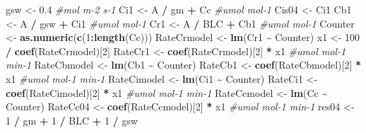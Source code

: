 \documentclass[
]{krantz}
\makeatletter
\newenvironment{Shaded}{\begin{snugshade}}{\end{snugshade}}
\newcommand{\CommentTok}[1]{\textcolor[rgb]{0.56,0.35,0.01}{\textit{#1}}}
\newcommand{\DecValTok}[1]{\textcolor[rgb]{0.00,0.00,0.81}{#1}}
\newcommand{\FloatTok}[1]{\textcolor[rgb]{0.00,0.00,0.81}{#1}}
\newcommand{\KeywordTok}[1]{\textcolor[rgb]{0.13,0.29,0.53}{\textbf{#1}}}
\newcommand{\NormalTok}[1]{#1}
\newcommand{\OperatorTok}[1]{\textcolor[rgb]{0.81,0.36,0.00}{\textbf{#1}}}
\newcommand{\StringTok}[1]{\textcolor[rgb]{0.31,0.60,0.02}{#1}}
\newenvironment{kframe}{%
\medskip{}
\setlength{\fboxsep}{.8em}
 \def\at@end@of@kframe{}%
 \ifinner\ifhmode%
  \def\at@end@of@kframe{\end{minipage}}%
  \begin{minipage}{\columnwidth}%
 \fi\fi%
 \def\FrameCommand##1{\hskip\@totalleftmargin \hskip-\fboxsep
 \colorbox{shadecolor}{##1}\hskip-\fboxsep
     \hskip-\linewidth \hskip-\@totalleftmargin \hskip\columnwidth}%
 \MakeFramed {\advance\hsize-\width
   \@totalleftmargin\z@ \linewidth\hsize
   \@setminipage}}%
 {\par\unskip\endMakeFramed%
 \at@end@of@kframe}
\renewenvironment{Shaded}{\begin{kframe}}{\end{kframe}}
\makeatother
\begin{document}
\begin{Shaded}
\begin{Highlighting}[]
\NormalTok{gsw \textless{}{-}}\StringTok{ }\FloatTok{0.4} \CommentTok{\#mol m{-}2 s{-}1}
\NormalTok{Ci1 \textless{}{-}}\StringTok{ }\NormalTok{A }\OperatorTok{/}\StringTok{ }\NormalTok{gm }\OperatorTok{+}\StringTok{ }\NormalTok{Cc }\CommentTok{\#umol mol{-}1}
\NormalTok{Cis04 \textless{}{-}}\StringTok{ }\NormalTok{Ci1}
\NormalTok{Cb1 \textless{}{-}}\StringTok{ }\NormalTok{A }\OperatorTok{/}\StringTok{ }\NormalTok{gsw }\OperatorTok{+}\StringTok{ }\NormalTok{Ci1 }\CommentTok{\#umol mol{-}1}
\NormalTok{Cr1 \textless{}{-}}\StringTok{ }\NormalTok{A }\OperatorTok{/}\StringTok{ }\NormalTok{BLC }\OperatorTok{+}\StringTok{ }\NormalTok{Cb1 }\CommentTok{\#umol mol{-}1}
\NormalTok{Counter \textless{}{-}}\StringTok{ }\KeywordTok{as.numeric}\NormalTok{(}\KeywordTok{c}\NormalTok{(}\DecValTok{1}\OperatorTok{:}\KeywordTok{length}\NormalTok{(Cc)))}
\NormalTok{RateCrmodel \textless{}{-}}\StringTok{ }\KeywordTok{lm}\NormalTok{(Cr1 }\OperatorTok{\textasciitilde{}}\StringTok{ }\NormalTok{Counter)}
\NormalTok{x1 \textless{}{-}}\StringTok{ }\DecValTok{100} \OperatorTok{/}\StringTok{ }\KeywordTok{coef}\NormalTok{(RateCrmodel)[}\DecValTok{2}\NormalTok{] }
\NormalTok{RateCr1 \textless{}{-}}\StringTok{ }\KeywordTok{coef}\NormalTok{(RateCrmodel)[}\DecValTok{2}\NormalTok{] }\OperatorTok{*}\StringTok{ }\NormalTok{x1 }\CommentTok{\#umol mol{-}1 min{-}1}
\NormalTok{RateCbmodel \textless{}{-}}\StringTok{ }\KeywordTok{lm}\NormalTok{(Cb1 }\OperatorTok{\textasciitilde{}}\StringTok{ }\NormalTok{Counter)}
\NormalTok{RateCb1 \textless{}{-}}\StringTok{ }\KeywordTok{coef}\NormalTok{(RateCbmodel)[}\DecValTok{2}\NormalTok{] }\OperatorTok{*}\StringTok{ }\NormalTok{x1 }\CommentTok{\#umol mol{-}1 min{-}1}
\NormalTok{RateCimodel \textless{}{-}}\StringTok{ }\KeywordTok{lm}\NormalTok{(Ci1 }\OperatorTok{\textasciitilde{}}\StringTok{ }\NormalTok{Counter)}
\NormalTok{RateCi1 \textless{}{-}}\StringTok{ }\KeywordTok{coef}\NormalTok{(RateCimodel)[}\DecValTok{2}\NormalTok{] }\OperatorTok{*}\StringTok{ }\NormalTok{x1 }\CommentTok{\#umol mol{-}1 min{-}1}
\NormalTok{RateCcmodel \textless{}{-}}\StringTok{ }\KeywordTok{lm}\NormalTok{(Cc }\OperatorTok{\textasciitilde{}}\StringTok{ }\NormalTok{Counter)}
\NormalTok{RateCc04 \textless{}{-}}\StringTok{ }\KeywordTok{coef}\NormalTok{(RateCcmodel)[}\DecValTok{2}\NormalTok{] }\OperatorTok{*}\StringTok{ }\NormalTok{x1 }\CommentTok{\#umol mol{-}1 min{-}1}
\NormalTok{res04 \textless{}{-}}\StringTok{ }\DecValTok{1} \OperatorTok{/}\StringTok{ }\NormalTok{gm }\OperatorTok{+}\StringTok{ }\DecValTok{1} \OperatorTok{/}\StringTok{ }\NormalTok{BLC }\OperatorTok{+}\StringTok{ }\DecValTok{1} \OperatorTok{/}\StringTok{ }\NormalTok{gsw}


\end{Highlighting}
\end{Shaded}
\end{document}
